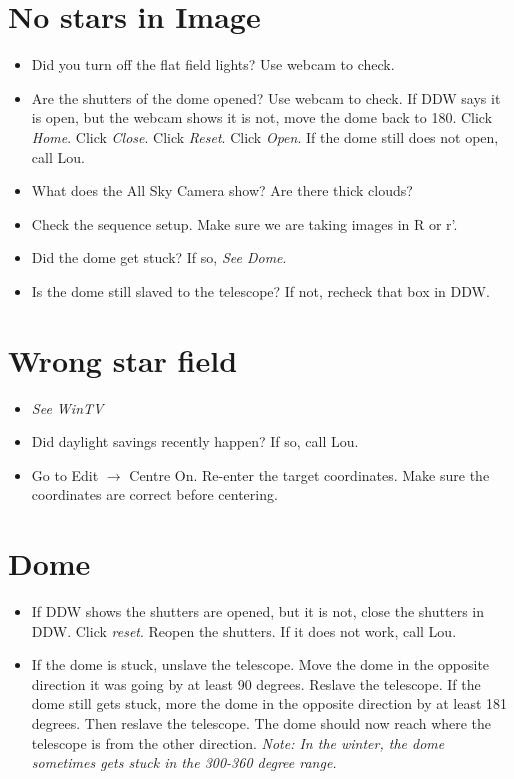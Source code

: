 \documentclass[11pt]{report}
\begin{document}
\section{No stars in Image}

\begin{itemize}
\item Did you turn off the flat field lights? Use webcam to check.
\item Are the shutters of the dome opened? Use webcam to check. If DDW says it is open, but the webcam shows it is not, move the dome back to 180. Click \emph{Home}. Click \emph{Close}. Click \emph{Reset}. Click \emph{Open}. If the dome still does not open, call Lou.
\item What does the All Sky Camera show? Are there thick clouds?
\item Check the sequence setup. Make sure we are taking images in R or r'.
\item Did the dome get stuck? If so, \emph{See Dome}.
\item Is the dome still slaved to the telescope? If not, recheck that box in DDW.
\end{itemize}

\section{Wrong star field}

\begin{itemize}
\item \emph{See WinTV}
\item Did daylight savings recently happen? If so, call Lou.
\item Go to Edit {$\rightarrow$} Centre On. Re-enter the target coordinates. Make sure the coordinates are correct before centering.
\end{itemize}

\section{Dome}
\begin{itemize}
\item If DDW shows the shutters are opened, but it is not, close the shutters in DDW. Click \emph{reset}. Reopen the shutters. If it does not work, call Lou.
\item If the dome is stuck, unslave the telescope. Move the dome in the opposite direction it was going by at least 90 degrees. Reslave the telescope. If the dome still gets stuck, more the dome in the opposite direction by at least 181 degrees. Then reslave the telescope. The dome should now reach where the telescope is from the other direction. \emph{Note: In the winter, the dome sometimes gets stuck in the 300-360 degree range.}
\end{itemize}
\end{document}
